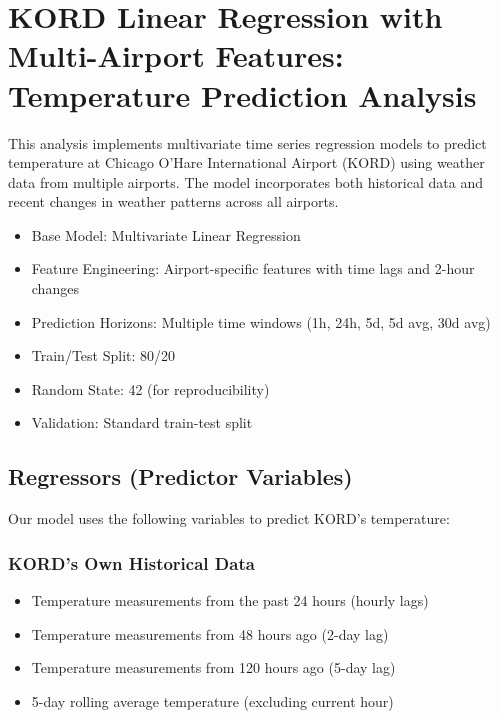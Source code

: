 \section{KORD Linear Regression with Multi-Airport Features: Temperature Prediction Analysis}
This analysis implements multivariate time series regression models to predict temperature at Chicago O'Hare International Airport (KORD) using weather data from multiple airports. The model incorporates both historical data and recent changes in weather patterns across all airports.\
\begin{itemize}
  \item Base Model: Multivariate Linear Regression
  \item Feature Engineering: Airport-specific features with time lags and 2-hour changes
  \item Prediction Horizons: Multiple time windows (1h, 24h, 5d, 5d avg, 30d avg)
  \item Train/Test Split: 80/20
  \item Random State: 42 (for reproducibility)
  \item Validation: Standard train-test split
\end{itemize}


\subsection{Regressors (Predictor Variables)}
Our model uses the following variables to predict KORD's temperature:

\subsubsection{KORD's Own Historical Data}
\begin{itemize}
  \item Temperature measurements from the past 24 hours (hourly lags)
  \item Temperature measurements from 48 hours ago (2-day lag)
  \item Temperature measurements from 120 hours ago (5-day lag)
  \item 5-day rolling average temperature (excluding current hour)
\end{itemize}

